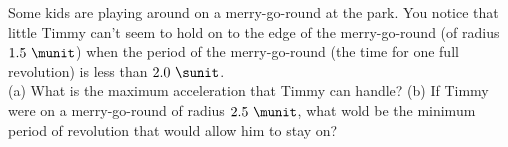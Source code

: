 Some kids are playing around on a merry-go-round at the park. You
notice that little Timmy can't seem to hold on to the edge of the
merry-go-round (of radius $1.5\ \munit$) when the period of the
merry-go-round (the time for one full revolution) is less than 
$2.0\ \sunit$.\\
%
(a) What is the maximum acceleration that Timmy can
handle?\hwendpart
%
(b) If Timmy were on a merry-go-round of radius $2.5\ \munit$, what wold be
the minimum period of revolution that would allow him to stay on?

